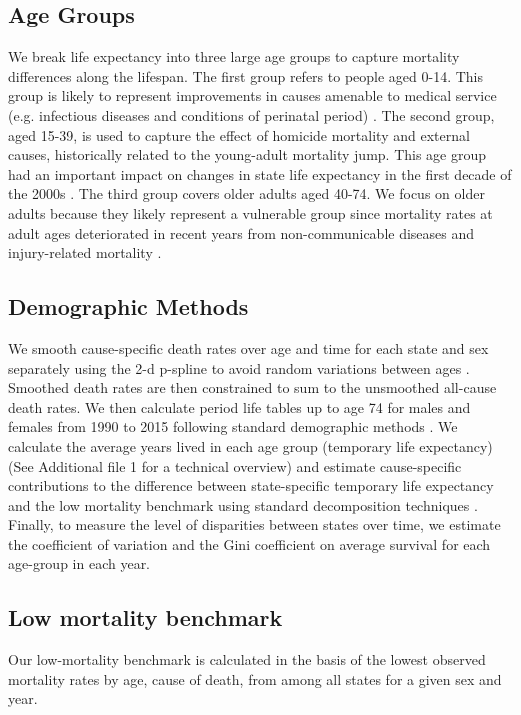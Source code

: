 \documentclass{bmcart}
\begin{document}

\subsection*{Age Groups}

We break life expectancy into three large age groups to capture mortality differences along the lifespan. The first group refers to people aged 0-14. This group is likely to represent improvements in causes amenable to medical service (e.g. infectious diseases and conditions of perinatal period) \cite{canudas2014}. The second group, aged 15-39, is used to capture the effect of homicide mortality and external causes, historically related to the young-adult mortality jump. This age group had an important impact on changes in state life expectancy in the first decade of the 2000s \cite{Aburto2015}. The third group covers older adults aged 40-74. We focus on older adults because they likely represent a vulnerable group since mortality rates at adult ages deteriorated in recent years from non-communicable diseases and injury-related mortality \cite{gonzalez2011health,gomez2016dissonant}.

\subsection*{Demographic Methods}
We smooth cause-specific death rates over age and time for each
state and sex separately using the 2-d p-spline
to avoid random variations between ages \cite{GC2012}. Smoothed death rates are
then constrained to sum to the unsmoothed all-cause death rates. We then calculate period life tables up to
age 74 for males and females from 1990 to 2015 following standard demographic methods \cite{HMDMP}. We calculate the average years lived in each age group (temporary life expectancy) \cite{arriaga1984} (See Additional file 1 for a technical overview) and estimate cause-specific contributions to the difference between
state-specific temporary life expectancy and  the low mortality benchmark using
 standard decomposition techniques \cite{horiuchi2008}. Finally, to measure the level of disparities between states over time, we estimate the coefficient of variation and the Gini coefficient on average survival for each age-group in each year. 

\subsection*{Low mortality benchmark}
Our low-mortality benchmark is calculated in the basis of the lowest observed mortality rates by age, cause of death, from among all states for a given sex and year.
\end{document}
